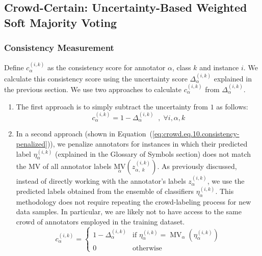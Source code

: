 \subsection{Crowd-Certain: Uncertainty-Based Weighted Soft Majority Voting}

\subsubsection{Consistency Measurement}
Define $c_{\alpha}^{(i,k)} $ as the consistency score for annotator $\alpha $, class $k $ and instance $i $. We calculate this consistency score using the uncertainty score $\Delta_{\alpha}^{(i,k)} $ explained in the previous section. We use two approaches to calculate $c_{\alpha}^{(i,k)} $ from $\Delta_{\alpha}^{(i,k)} $.
\begin{enumerate}
    \item The first approach is to simply subtract the uncertainty from $1 $ as follows:
    \begin{equation}
        c_{\alpha}^{(i,k)}=1-\Delta_{\alpha}^{(i,k)}\;\;,\;\forall i,\alpha,k
        \label{eq:crowd.Eq.9.consistency}
    \end{equation}
    \item In a second approach (shown in Equation~(\ref{eq:crowd.eq.10.consistency-penalized})), we penalize annotators for instances in which their predicted label $\eta_{\alpha}^{(i,k)} $ (explained in the Glossary of Symbols section) does not match the MV of all annotator labels ${{\underset \alpha{\mathrm{MV}}}{\left(z_{\alpha,\;k}^{(i,k)}\right)}} $. As previously discussed, instead of directly working with the annotator's labels $z_{\alpha}^{(i,k)} $, we use the predicted labels obtained from the ensemble of classifiers $\eta_{\alpha}^{(i,k)} $. This methodology does not require repeating the crowd-labeling process for new data samples. In particular, we are likely not to have access to the same crowd of annotators employed in the training dataset.
    \begin{equation}
        c_{\alpha}^{(i,k)} =
        \begin{cases}
            1 - \Delta_{\alpha}^{(i,k)} & \text{if } \eta_{\alpha}^{(i,k)} = \operatorname{MV}_{\alpha}(\eta_{\alpha}^{(i,k)}) \\
            0 & \text{otherwise}
        \end{cases}
        \label{eq:crowd.eq.10.consistency-penalized}
    \end{equation}
\end{enumerate}

